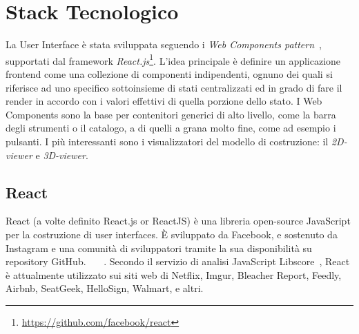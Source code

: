 \section{Stack Tecnologico}
\label{sec:chapter_2_section_3}

La User Interface è stata sviluppata seguendo i \emph{Web Components pattern}~\cite{web_components},
supportati dal framework \emph{React.js}\footnote{\url{https://github.com/facebook/react}}.
L'idea principale è definire un applicazione frontend come una collezione di componenti indipendenti,
ognuno dei quali si riferisce ad uno specifico sottoinsieme di stati centralizzati ed in grado
di fare il render in accordo con i valori effettivi di quella porzione dello stato.
I Web Components sono la base per contenitori generici di alto livello, come la barra degli strumenti o il catalogo,
a di quelli a grana molto fine, come ad esempio i pulsanti. I più interessanti sono i visualizzatori del
modello di costruzione: il \emph{2D-viewer} e \emph{3D-viewer}.

%
\subsection{React}
\label{sec:chapter_2_section_3_sub_1}
React (a volte definito React.js or ReactJS) è una libreria open-source JavaScript per la costruzione di user interfaces.
\`E sviluppato da Facebook, e sostenuto da Instagram e una comunità di sviluppatori tramite la sua disponibilità su repository GitHub.
~\cite{infoworld}~\cite{facebookreact}~\cite{reactjs}. Secondo il servizio di analisi JavaScript Libscore~\cite{libscope},
React è attualmente utilizzato sui  siti web di Netflix, Imgur, Bleacher Report, Feedly, Airbnb, SeatGeek,
HelloSign, Walmart, e altri.


